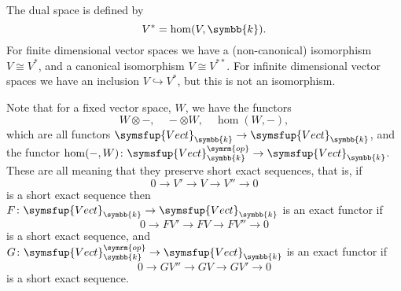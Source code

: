 \documentclass[fleqn]{NotesClass}
\makeatletter
\newcommand{\c@egory}[1]{\symsfup{#1}}
\newcommand{\Vect}[1][\field]{\c@egory{Vect}_{#1}}
\newcommand{\isomorphic}{\cong}
\renewcommand{\field}{\symbb{k}}
\newcommand{\op}{\symrm{op}}
\makeatother
\begin{document}
    The dual space is defined by
    \begin{equation}
        V^* = \hom(V, \field).
    \end{equation}
    For finite dimensional vector spaces we have a (non-canonical) isomorphism \(V \isomorphic V^*\), and a canonical isomorphism \(V \isomorphic V^{**}\).
    For infinite dimensional vector spaces we have an inclusion \(V \hookrightarrow V^*\), but this is not an isomorphism.
    
    Note that for a fixed vector space, \(W\), we have the functors
    \begin{equation}
        W \otimes -, \quad - \otimes W, \quad \hom(W, -),
    \end{equation}
    which are all functors \(\Vect \to \Vect\), and the functor \(\hom(-, W) \colon \Vect^{\op} \to \Vect\).
    These are all  meaning that they preserve short exact sequences, that is, if
    \begin{equation}
        0 \to V' \to V \to V'' \to 0
    \end{equation}
    is a short exact sequence then \(F \colon \Vect \to \Vect\) is an exact functor if
    \begin{equation}
        0 \to FV' \to FV \to FV'' \to 0
    \end{equation}
    is a short exact sequence, and \(G \colon \Vect^{\op} \to \Vect\) is an exact functor if
    \begin{equation}
        0 \to GV'' \to GV \to GV' \to 0
    \end{equation}
    is a short exact sequence.
    
    
    
    
    \backmatter
    \renewcommand{\glossaryname}{Acronyms}
    \printglossary[acronym]
    \printindex
\end{document}
